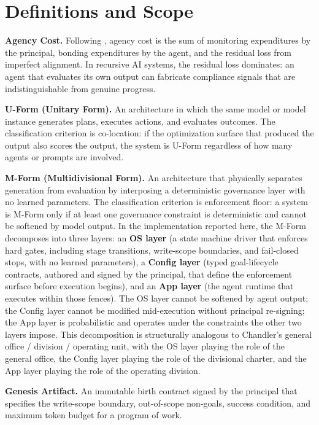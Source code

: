 \documentclass[11pt]{article}
\begin{document}
\section{Definitions and Scope}

\textbf{Agency Cost.} Following \citet{jensen1976}, agency cost is the sum of monitoring expenditures by the principal, bonding expenditures by the agent, and the residual loss from imperfect alignment. In recursive AI systems, the residual loss dominates: an agent that evaluates its own output can fabricate compliance signals that are indistinguishable from genuine progress.

\textbf{U-Form (Unitary Form).} An architecture in which the same model or model instance generates plans, executes actions, and evaluates outcomes. The classification criterion is co-location: if the optimization surface that produced the output also scores the output, the system is U-Form regardless of how many agents or prompts are involved.

\textbf{M-Form (Multidivisional Form).} An architecture that physically separates generation from evaluation by interposing a deterministic governance layer with no learned parameters. The classification criterion is enforcement floor: a system is M-Form only if at least one governance constraint is deterministic and cannot be softened by model output. In the implementation reported here, the M-Form decomposes into three layers: an \textbf{OS layer} (a state machine driver that enforces hard gates, including stage transitions, write-scope boundaries, and fail-closed stops, with no learned parameters), a \textbf{Config layer} (typed goal-lifecycle contracts, authored and signed by the principal, that define the enforcement surface before execution begins), and an \textbf{App layer} (the agent runtime that executes within those fences). The OS layer cannot be softened by agent output; the Config layer cannot be modified mid-execution without principal re-signing; the App layer is probabilistic and operates under the constraints the other two layers impose. This decomposition is structurally analogous to Chandler's general office / division / operating unit, with the OS layer playing the role of the general office, the Config layer playing the role of the divisional charter, and the App layer playing the role of the operating division.

\textbf{Genesis Artifact.} An immutable birth contract signed by the principal that specifies the write-scope boundary, out-of-scope non-goals, success condition, and maximum token budget for a program of work.
\end{document}
